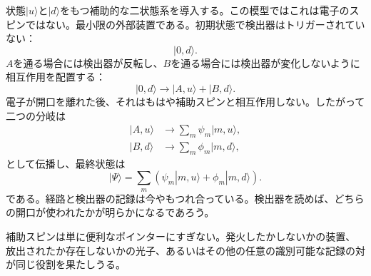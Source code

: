 状態\(|u\rangle\)と\(|d\rangle\)をもつ補助的な二状態系を導入する。この模型ではこれは電子のスピンではない。最小限の外部装置である。初期状態で検出器はトリガーされていない：
\begin{equation}
|0,d\rangle.
\end{equation}
\(A\)を通る場合には検出器が反転し、\(B\)を通る場合には検出器が変化しないように相互作用を配置する：
\begin{equation}
|0,d\rangle
\longrightarrow
|A,u\rangle+|B,d\rangle.
\end{equation}
電子が開口を離れた後、それはもはや補助スピンと相互作用しない。したがって二つの分岐は
\begin{align}
|A,u\rangle &\longrightarrow \sum_m\psi_m|m,u\rangle, \\
|B,d\rangle &\longrightarrow \sum_m\phi_m|m,d\rangle,
\end{align}
として伝播し、最終状態は
\begin{equation}
|\Psi\rangle
=\sum_m\left(\psi_m|m,u\rangle+\phi_m|m,d\rangle\right).
\end{equation}
である。経路と検出器の記録は今やもつれ合っている。検出器を読めば、どちらの開口が使われたかが明らかになるであろう。

\begin{classroomqa}
\end{classroomqa}

補助スピンは単に便利なポインターにすぎない。発火したかしないかの装置、放出されたか存在しないかの光子、あるいはその他の任意の識別可能な記録の対が同じ役割を果たしうる。

\begin{classroomqa}
\end{classroomqa}

